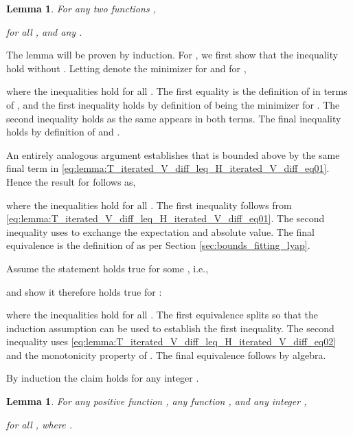 \documentclass[journal]{IEEEtran}
\newtheorem{lemma}[theorem]{Lemma}
\begin{document}
\vspace{0.2cm}


\begin{lemma} \label{lemma:T_iterated_V_diff_leq_H_iterated_V_diff}
	For any two functions ,
	
	for all , and any .
\end{lemma}

\vspace{0.2cm}

\begin{IEEEproof}
	The lemma will be proven by induction. For , we first show that the inequality hold without . Letting  denote the minimizer for  and  for ,

where the inequalities hold for all . The first equality is the definition of  in terms of , and the first inequality holds by definition of  being the minimizer for . The second inequality holds as the same  appears in both terms. The final inequality holds by definition of  and .
	
	
	An entirely analogous argument establishes that  is bounded above by the same final term in \eqref{eq:lemma:T_iterated_V_diff_leq_H_iterated_V_diff_eq01}. Hence the result for  follows as,
	
	where the inequalities hold for all . The first inequality follows from \eqref{eq:lemma:T_iterated_V_diff_leq_H_iterated_V_diff_eq01}. The second inequality uses \cite[Lemma 1.7.2]{christensen_2010_functions} to exchange the expectation and absolute value. The final equivalence is the definition of  as per Section \ref{sec:bounds_fitting_lyap}.

	Assume the statement holds true for some , i.e.,
	
	and show it therefore holds true for :
	
	where the inequalities hold for all . The first equivalence splits  so that the induction assumption can be used to establish the first inequality. The second inequality uses \eqref{eq:lemma:T_iterated_V_diff_leq_H_iterated_V_diff_eq02} and the monotonicity property of . The final equivalence follows by algebra.
	
	By induction the claim holds for any integer .
\end{IEEEproof}



\vspace{0.2cm}


\begin{lemma} \label{lemma:T_iterated_V_geq_V_minusLyap}
	For any positive function , any function , and any integer ,
	
	for all , where .
\end{lemma}
\end{document}
